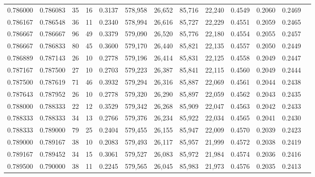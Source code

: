 \begin{tabular}{rrrrrrrrrrrrr}
0.786000 & 0.786083 &    35 &  16 &                                     0.3137 & 578,958 &  26,652 &  85,716 &  22,240 & 0.4549 & 0.2060 & 0.2469 \\
0.786167 & 0.786548 &    36 &  11 &                                     0.2340 & 578,994 &  26,616 &  85,727 &  22,229 & 0.4551 & 0.2059 & 0.2465 \\
0.786667 & 0.786667 &    96 &  49 &                                     0.3379 & 579,090 &  26,520 &  85,776 &  22,180 & 0.4554 & 0.2055 & 0.2457 \\
0.786667 & 0.786833 &    80 &  45 &                                     0.3600 & 579,170 &  26,440 &  85,821 &  22,135 & 0.4557 & 0.2050 & 0.2449 \\
0.786889 & 0.787143 &    26 &  10 &                                     0.2778 & 579,196 &  26,414 &  85,831 &  22,125 & 0.4558 & 0.2049 & 0.2447 \\
0.787167 & 0.787500 &    27 &  10 &                                     0.2703 & 579,223 &  26,387 &  85,841 &  22,115 & 0.4560 & 0.2049 & 0.2444 \\
0.787500 & 0.787619 &    71 &  46 &                                     0.3932 & 579,294 &  26,316 &  85,887 &  22,069 & 0.4561 & 0.2044 & 0.2438 \\
0.787643 & 0.787952 &    26 &  10 &                                     0.2778 & 579,320 &  26,290 &  85,897 &  22,059 & 0.4562 & 0.2043 & 0.2435 \\
0.788000 & 0.788333 &    22 &  12 &                                     0.3529 & 579,342 &  26,268 &  85,909 &  22,047 & 0.4563 & 0.2042 & 0.2433 \\
0.788333 & 0.788333 &    34 &  13 &                                     0.2766 & 579,376 &  26,234 &  85,922 &  22,034 & 0.4565 & 0.2041 & 0.2430 \\
0.788333 & 0.789000 &    79 &  25 &                                     0.2404 & 579,455 &  26,155 &  85,947 &  22,009 & 0.4570 & 0.2039 & 0.2423 \\
0.789000 & 0.789167 &    38 &  10 &                                     0.2083 & 579,493 &  26,117 &  85,957 &  21,999 & 0.4572 & 0.2038 & 0.2419 \\
0.789167 & 0.789452 &    34 &  15 &                                     0.3061 & 579,527 &  26,083 &  85,972 &  21,984 & 0.4574 & 0.2036 & 0.2416 \\
0.789500 & 0.790000 &    38 &  11 &                                     0.2245 & 579,565 &  26,045 &  85,983 &  21,973 & 0.4576 & 0.2035 & 0.2413 \\

\end{tabular}
